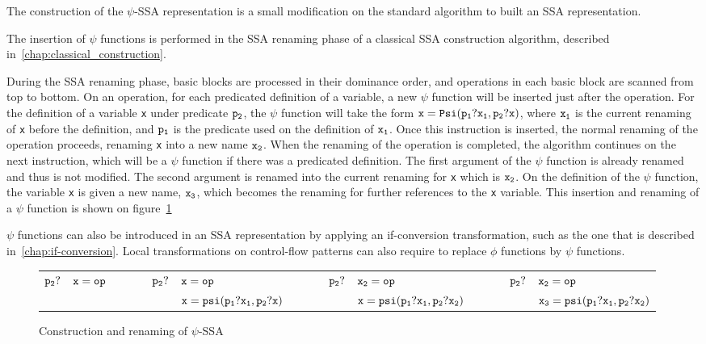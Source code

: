 
The construction of the $\psi$-SSA representation is a small
modification on the standard algorithm to built an SSA representation.

The insertion of $\psi$ functions is performed in the SSA renaming
phase of a classical SSA construction algorithm, described
in~\ref{chap:classical_construction}.

During the SSA renaming phase, basic blocks are processed in their
dominance order, and operations in each basic block are scanned from
top to bottom. On an operation, for each predicated definition of a
variable, a new $\psi$ function will be inserted just after the
operation. For the definition of a variable {\tt x} under predicate
${\tt p_2}$, the $\psi$ function will take the form ${\tt x = Psi(p_1?x_1,
  p_2?x)}$, where ${\tt x_1}$ is the current renaming of {\tt x} before
the definition, and ${\tt p_1}$ is the predicate used on the definition of
${\tt x_1}$. Once this instruction is inserted, the normal renaming of
the operation proceeds, renaming {\tt x} into a new name ${\tt
  x_2}$. When the renaming of the operation is completed, the
algorithm continues on the next instruction, which will be a $\psi$
function if there was a predicated definition. The first argument of
the $\psi$ function is already renamed and thus is not modified. The
second argument is renamed into the current renaming for {\tt x}
which is ${\tt x_2}$. On the definition of the $\psi$ function, the
variable {\tt x} is given a new name, ${\tt x_3}$, which becomes the
renaming for further references to the {\tt x} variable. This
insertion and renaming of a $\psi$ function is shown on
figure~\ref{fig:psi_ssa_construct}

$\psi$ functions can also be introduced in an SSA representation by
applying an if-conversion transformation, such as the one that is
described in~\ref{chap:if-conversion}. Local transformations on
control-flow patterns can also require to replace $\phi$ functions by
$\psi$ functions.

\begin{figure}
\begin{center}
\footnotesize
\begin{tabular}{lllllllllll}
${\tt p_2?}$ & ${\tt x = op}$ & \ \ \ \  & ${\tt p_2?}$ & ${\tt x = op}$                  & \ \ \ \  & ${\tt p_2?}$ & ${\tt x_2 = op}$               & \ \ \ \  & ${\tt p_2?}$ & ${\tt x_2 = op}$ \\
             &                &          &              & ${\tt x = psi(p_1?x_1, p_2?x)}$ &           &           & ${\tt x = psi(p_1?x_1, p_2?x_2)}$ &          &           & ${\tt x_3 = psi(p_1?x_1, p_2?x_2)}$ \\
\end{tabular}
\caption{Construction and renaming of $\psi$-SSA}
\label{fig:psi_ssa_construct}
\end{center}
\end{figure}



